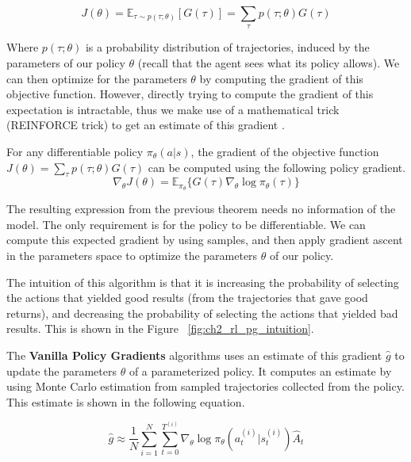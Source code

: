 \begin{equation}
    J(\theta) = \mathbb{E}_{\tau \sim p(\tau;\theta)}[G(\tau)] = \sum_{\tau} p(\tau;\theta) G(\tau)
\end{equation}

Where $p(\tau;\theta)$ is a probability distribution of trajectories, induced by
the parameters of our policy $\theta$ (recall that the agent sees what its policy allows).
We can then optimize for the parameters $\theta$ by computing the gradient of this
objective function. However, directly trying to compute the gradient of this expectation
is intractable, thus we make use of a mathematical trick (REINFORCE trick) to get an estimate of this gradient \citep{PGSutton}.

\begin{theorem}
    For any differentiable policy $\pi_{\theta}(a|s)$, the gradient of the
    objective function $J(\theta) = \sum_{\tau} p(\tau;\theta) G(\tau)$ 
    can be computed using the following policy gradient.
    \begin{equation}
        \nabla_{\theta} J(\theta) = \mathbb{E}_{\pi_{\theta}} \lbrace G(\tau) \nabla_{\theta} \log \pi_{\theta} (\tau) \rbrace
    \end{equation}
\end{theorem}

The resulting expression from the previous theorem needs no information of the model.
The only requirement is for the policy to be differentiable. We can compute this expected
gradient by using samples, and then apply gradient ascent in the parameters space to optimize 
the parameters $\theta$ of our policy.

The intuition of this algorithm is that it is increasing the probability of selecting
the actions that yielded good results (from the trajectories that gave good returns), 
and decreasing the probability of selecting the actions that yielded bad results. This
is shown in the Figure ~\ref{fig:ch2_rl_pg_intuition}.

\figRlPolicyGradientsIntuition

The \textbf{Vanilla Policy Gradients} algorithms uses an estimate of this gradient
$\hat g$ to update the parameters $\theta$ of a parameterized policy. It computes
an estimate by using Monte Carlo estimation from sampled trajectories collected from
the policy. This estimate is shown in the following equation.

\begin{equation} \label{eq:ch2_vanilla_policy_gradient}
  \hat g \approx \frac{1}{N} 
                    \sum_{i=1}^{N} \sum_{t=0}^{T^{(i)}} 
                            \nabla_{\theta} \log \pi_{\theta} 
                                            ( a_{t}^{(i)} | s_{t}^{(i)} ) \hat A_{t}
\end{equation}

